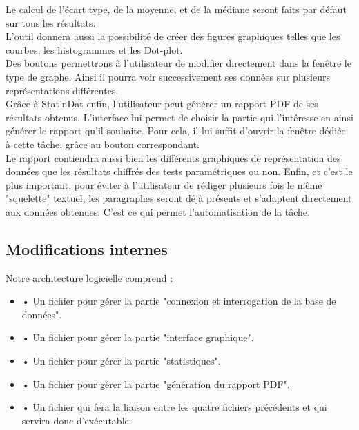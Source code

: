 \documentclass[a4paper,10pt]{report}
\begin{document}
Le calcul de l'écart type, de la moyenne, et de la médiane seront faits par défaut sur tous les résultats.\\ 

L'outil donnera aussi la possibilité de créer des figures graphiques telles que les courbes, les histogrammes et les Dot-plot.\\
Des boutons permettrons à l'utilisateur de modifier directement dans la fenêtre le type de graphe. Ainsi il pourra voir successivement ses données sur plusieurs représentations différentes.\\

Grâce à Stat'nDat enfin, l'utilisateur peut générer un rapport PDF de ses résultats obtenus. L'interface lui permet de choisir la partie qui l'intéresse en ainsi générer le rapport qu'il souhaite. Pour cela, il lui suffit d'ouvrir la fenêtre dédiée à cette tâche, grâce au bouton correspondant.\\
Le rapport contiendra aussi bien les différents graphiques de représentation des données que les résultats chiffrés des tests paramétriques ou non. Enfin, et c'est le plus important, pour éviter à l'utilisateur de rédiger plusieurs fois le même "squelette" textuel, les paragraphes seront déjà présents et s'adaptent directement aux données obtenues. C'est ce qui permet l'automatisation de la tâche.


\subsection{Modifications internes}

Notre architecture logicielle comprend :

\begin{itemize}

\item • Un fichier pour gérer la partie "connexion et interrogation de la base de données".

\item • Un fichier pour gérer la partie "interface graphique".

\item • Un fichier pour gérer la partie "statistiques".

\item • Un fichier pour gérer la partie "génération du rapport PDF".

\item • Un fichier qui fera la liaison entre les quatre fichiers précédents et qui servira donc d'exécutable.

\end{itemize}
\end{document}
